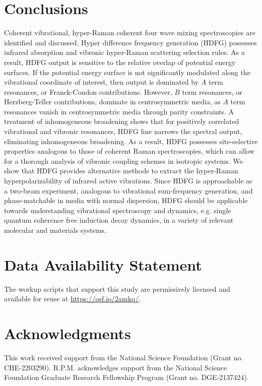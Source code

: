 \documentclass[aip, jcp, reprint, onecolumn, nofootinbib]{revtex4-2}
\begin{document}
\section{Conclusions}\label{conclusion}
Coherent vibrational, hyper-Raman coherent four wave mixing spectroscopies are identified and discussed.
Hyper difference frequency generation (HDFG) possesses infrared absorption and vibronic hyper-Raman scattering selection rules.
As a result, HDFG output is sensitive to the relative overlap of potential energy surfaces.
If the potential energy surface is not significantly modulated along the vibrational coordinate of interest, then output is dominated by $A$ term resonances, or Franck-Condon contributions.
However, $B$ term resonances, or Herzberg-Teller contributions, dominate in centrosymmetric media, as $A$ term resonances vanish in centrosymmetric media through parity constraints.
A treatment of inhomogeneous broadening shows that for positively correlated vibrational and vibronic resonances, HDFG line narrows the spectral output, eliminating inhomogeneous broadening. 
As a result, HDFG possesses site-selective properties analogous to those of coherent Raman spectroscopies, which can allow for a thorough analysis of vibronic coupling schemes in isotropic systems.
We show that HDFG provides alternative methods to extract the hyper-Raman hyperpolarizability of infrared active vibrations. 
Since HDFG is approachable as a two-beam experiment, analogous to vibrational sum-frequency generation, and phase-matchable in media with normal dispersion, HDFG should be applicable towards understanding vibrational spectroscopy and dynamics, e.g. single quantum coherence free induction decay dynamics, in a variety of relevant molecular and materials systems.  

\section{Data Availability Statement}
The workup scripts that support this study are permissively licensed and available for reuse at \href{https://osf.io/2amkq/}{https://osf.io/2amkq/}.

\section{Acknowledgments}
This work received support from the National Science Foundation (Grant no. CHE-2203290).
R.P.M. acknowledges support from the National Science Foundation Graduate Research Fellowship Program (Grant no. DGE-2137424). 
\end{document}
